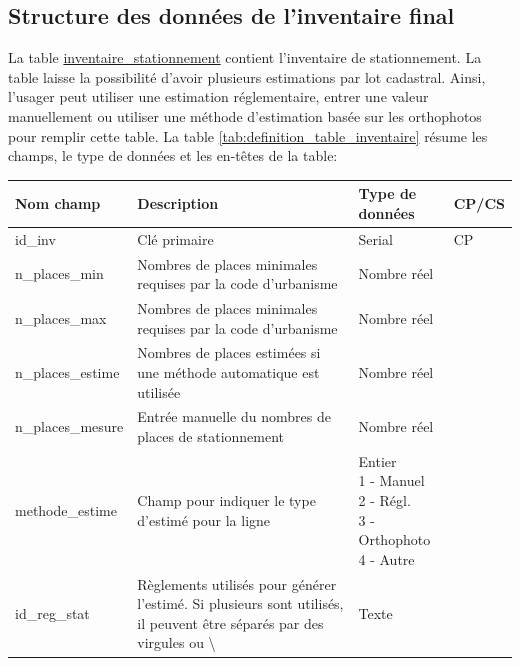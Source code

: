     \subsection{Structure des données de l'inventaire final}
    La table \underline{inventaire\_stationnement} contient l'inventaire de stationnement. La table laisse la possibilité d'avoir plusieurs estimations par lot cadastral. Ainsi, l'usager peut utiliser une estimation réglementaire, entrer une valeur manuellement ou utiliser une méthode d'estimation basée sur les orthophotos pour remplir cette table. La table \ref{tab:definition_table_inventaire} résume les champs, le type de données et les en-têtes de la table:
    \begin{table}[h]
        \centering
        \begin{tabular}{m{}|m{}m{}m{}}
            \hline
            Nom champ & Description & Type de données & CP/CS  \\
            \hline
            id\_inv & Clé primaire  & Serial & CP \\ 
            n\_places\_min & Nombres de places minimales requises par la code d'urbanisme & Nombre réel &\\ 
            n\_places\_max & Nombres de places minimales requises par la code d'urbanisme & Nombre réel & \\ 
            n\_places\_estime & Nombres de places estimées si une méthode automatique est utilisée & Nombre réel&\\ 
            n\_places\_mesure & Entrée manuelle du nombres de places de stationnement & Nombre réel&\\
            methode\_estime & Champ pour indiquer le type d'estimé pour la ligne & \makecell[l]{Entier\\
                                                                                             1 - Manuel\\
                                                                                             2 - Régl.\\
                                                                                             3 - Orthophoto\\
                                                                                             4 - Autre}  & \\ 
            id\_reg\_stat & Règlements utilisés pour générer l'estimé. Si plusieurs sont utilisés, il peuvent être séparés par des virgules ou \textbackslash & Texte & \\ 

\end{tabular}
\end{table}
